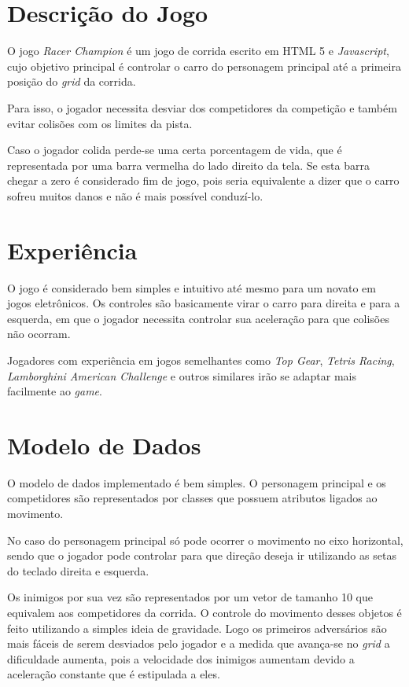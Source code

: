 \setlength{\parindent}{1.3cm}
\setlength{\parskip}{0.2cm}
\tableofcontents
\newpage

\thispagestyle{empty}
\section{Descrição do Jogo}

O jogo \textit{Racer Champion} é um jogo de corrida escrito em HTML 5 e \textit{Javascript}, cujo objetivo principal é controlar o carro do personagem principal
até a primeira posição do \textit{grid} da corrida.

Para isso, o jogador necessita desviar dos competidores da competição e também evitar colisões com os limites da pista. 

Caso o jogador colida perde-se uma certa porcentagem de vida, que é representada por uma barra vermelha do lado direito da tela. Se esta barra chegar a zero é 
considerado fim de jogo, pois seria equivalente a dizer que o carro sofreu muitos danos e não é mais possível conduzí-lo.

\section{Experiência}

O jogo é considerado bem simples e intuitivo até mesmo para um novato em jogos eletrônicos. Os controles são basicamente virar o carro para direita e para a
esquerda, em que o jogador necessita controlar sua aceleração para que colisões não ocorram.

Jogadores com experiência em jogos semelhantes como \textit{Top Gear}, \textit{Tetris Racing}, \textit{Lamborghini American Challenge} e outros similares irão
se adaptar mais facilmente ao \textit{game}.

\section{Modelo de Dados}

O modelo de dados implementado é bem simples. O personagem principal e os competidores são representados por classes que possuem atributos ligados ao movimento.

No caso do personagem principal só pode ocorrer o movimento no eixo horizontal, sendo que o jogador pode controlar para que direção deseja ir utilizando as
setas do teclado direita e esquerda.

Os inimigos por sua vez são representados por um vetor de tamanho 10 que equivalem aos competidores da corrida. O controle do movimento desses objetos é feito
utilizando a simples ideia de gravidade. Logo os primeiros adversários são mais fáceis de serem desviados pelo jogador e a medida que avança-se no \textit{grid}
a dificuldade aumenta, pois a velocidade dos inimigos aumentam devido a aceleração constante que é estipulada a eles.

